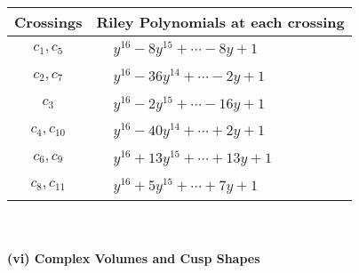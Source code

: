 \documentclass[1p]{elsarticle_modified}
\theoremstyle{definition}
\begin{document}
\begin{tabular}{m{50pt}|m{274pt}}
Crossings & \hspace{64pt}Riley Polynomials at each crossing \\
\hline $$\begin{aligned}c_{1},c_{5}\end{aligned}$$&$\begin{aligned}
&y^{16}-8 y^{15}+\cdots-8 y+1
\end{aligned}$\\
\hline $$\begin{aligned}c_{2},c_{7}\end{aligned}$$&$\begin{aligned}
&y^{16}-36 y^{14}+\cdots-2 y+1
\end{aligned}$\\
\hline $$\begin{aligned}c_{3}\end{aligned}$$&$\begin{aligned}
&y^{16}-2 y^{15}+\cdots-16 y+1
\end{aligned}$\\
\hline $$\begin{aligned}c_{4},c_{10}\end{aligned}$$&$\begin{aligned}
&y^{16}-40 y^{14}+\cdots+2 y+1
\end{aligned}$\\
\hline $$\begin{aligned}c_{6},c_{9}\end{aligned}$$&$\begin{aligned}
&y^{16}+13 y^{15}+\cdots+13 y+1
\end{aligned}$\\
\hline $$\begin{aligned}c_{8},c_{11}\end{aligned}$$&$\begin{aligned}
&y^{16}+5 y^{15}+\cdots+7 y+1
\end{aligned}$\\
\hline
\end{tabular}\\~\\
\newpage\flushleft \textbf{(vi) Complex Volumes and Cusp Shapes}
\end{document}
